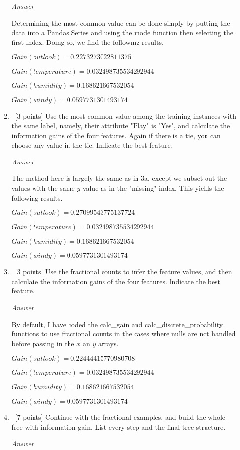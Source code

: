 \documentclass[12pt, fullpage,letterpaper]{article}
\begin{document}
\begin{enumerate}
\begin{enumerate}
\emph{Answer}

Determining the most common value can be done simply by putting the data into a Pandas Series and using the mode function then selecting the first index. Doing so, we find the following results.

$Gain(outlook)=0.2273273022811375$

$Gain(temperature)=0.032498735534292944$

$Gain(humidity)=0.168621667532054$

$Gain(windy)=0.0597731301493174$

\item~[3 points] Use the most common value among the  training instances with the same label, namely, their attribute "Play" is "Yes", and calculate the information gains of the four features. Again if there is a tie, you can choose any value in the tie. Indicate the best feature.

\emph{Answer}

The method here is largely the same as in 3a, except we subset out the values with the same $y$ value as in the "missing" index. This yields the following results.

$Gain(outlook)=0.27099543775137724$

$Gain(temperature)=0.032498735534292944$

$Gain(humidity)=0.168621667532054$

$Gain(windy)=0.0597731301493174$

\item~[3 points] Use the fractional counts to infer the feature values, and then calculate the information gains of the four features. Indicate the best feature.

\emph{Answer}

By default, I have coded the calc\_gain and calc\_discrete\_probability functions to use fractional counts in the cases where nulls are not handled before passing in the $x$ an $y$ arrays.

$Gain(outlook)=0.22444415770980708$

$Gain(temperature)=0.032498735534292944$

$Gain(humidity)=0.168621667532054$

$Gain(windy)=0.0597731301493174$

\item~[7 points] Continue with the fractional examples, and build the whole free with information gain. List every step and the final tree structure.

\emph{Answer}


\end{enumerate}
\end{enumerate}
\end{document}

